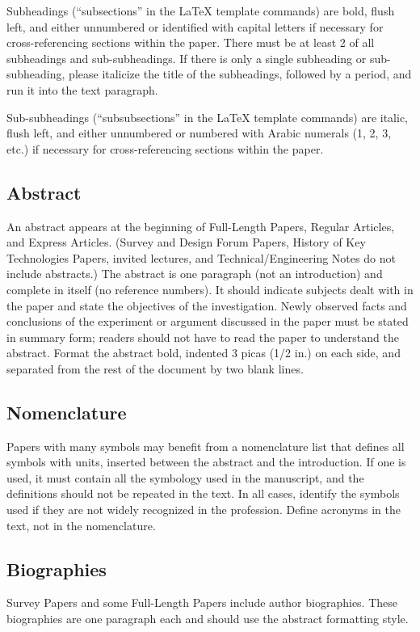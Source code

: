 Subheadings (``subsections'' in the \LaTeX{} template commands) are bold, flush left, and either unnumbered or identified with capital letters if necessary for cross-referencing sections within the paper. There must be at least 2 of all subheadings and sub-subheadings. If there is only a single subheading or sub-subheading, please italicize the title of the subheadings, followed by a period, and run it into the text paragraph. 

Sub-subheadings (``subsubsections'' in the \LaTeX{} template commands) are italic, flush left, and either unnumbered or numbered with Arabic numerals (1, 2, 3, etc.) if necessary for cross-referencing sections within the paper.


\subsection{Abstract}
An abstract appears at the beginning of Full-Length Papers, Regular Articles, and Express Articles. (Survey and Design Forum Papers, History of Key Technologies Papers, invited lectures, and Technical/Engineering Notes do not include abstracts.) The abstract is one paragraph (not an introduction) and complete in itself (no reference numbers). It should indicate subjects dealt with in the paper and state the objectives of the investigation. Newly observed facts and conclusions of the experiment or argument discussed in the paper must be stated in summary form; readers should not have to read the paper to understand the abstract. Format the abstract bold, indented 3 picas (1/2 in.) on each side, and separated from the rest of the document by two blank lines.


\subsection{Nomenclature}
Papers with many symbols may benefit from a nomenclature list that defines all symbols with units, inserted between the abstract and the introduction. If one is used, it must contain all the symbology used in the manuscript, and the definitions should not be repeated in the text. In all cases, identify the symbols used if they are not widely recognized in the profession. Define acronyms in the text, not in the nomenclature. 

\subsection{Biographies}
Survey Papers and some Full-Length Papers include author biographies. These biographies are one paragraph each and should use the abstract formatting style.

